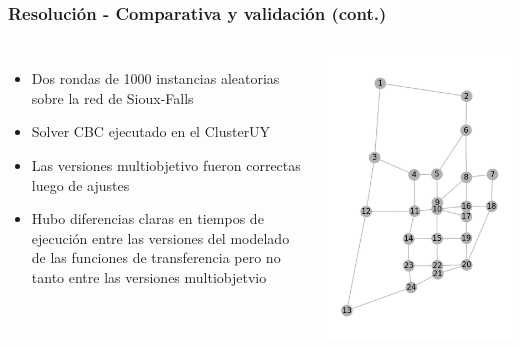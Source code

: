 \documentclass[aspectratio=43, 10pt]{beamer}
\begin{document}
\begin{frame}
    \frametitle{Resolución - Comparativa y validación (cont.)}

    \begin{columns}[c]
        \begin{itemize}
            \item{Dos rondas de 1000 instancias aleatorias sobre la red de Sioux-Falls}
            \item{Solver CBC ejecutado en el ClusterUY}
            \item{Las versiones multiobjetivo fueron correctas luego de ajustes}
            \item{Hubo diferencias claras en tiempos de ejecución entre las versiones
                del modelado de las funciones de transferencia pero no tanto entre las
                versiones multiobjetvio}
        \end{itemize}

        \includegraphics[width=\textwidth]{images/sioux_falls.png}
    \end{columns}
\end{frame}
\end{document}
